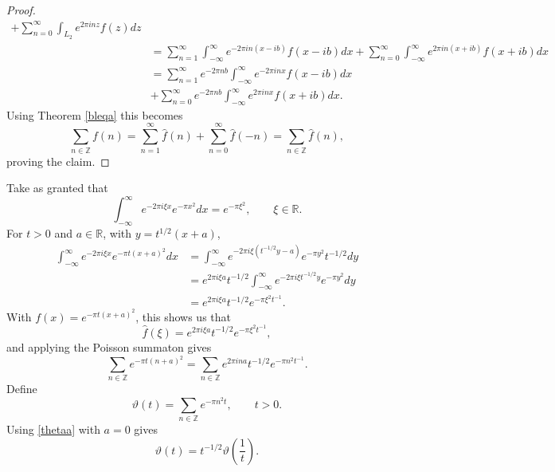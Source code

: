 \documentclass{article}
\theoremstyle{definition}
\begin{document}
\begin{proof}
\begin{align*}
+\sum_{n=0}^\infty \int_{L_2} e^{2\pi inz} f(z) dz\\
&=\sum_{n=1}^\infty \int_{-\infty}^\infty e^{-2\pi in(x-ib)}f(x-ib) dx
+\sum_{n=0}^\infty \int_{-\infty}^\infty e^{2\pi in(x+ib)}f(x+ib) dx\\
&=\sum_{n=1}^\infty e^{-2\pi nb} \int_{-\infty}^\infty e^{-2\pi inx} f(x-ib) dx\\
&+\sum_{n=0}^\infty e^{-2\pi nb} \int_{-\infty}^\infty e^{2\pi inx} f(x+ib) dx.
\end{align*}
Using Theorem \ref{bleqa} this becomes
\[
\sum_{n \in \mathbb{Z}} f(n) = \sum_{n=1}^\infty \widehat{f}(n) + \sum_{n=0}^\infty \widehat{f}(-n)
=\sum_{n \in \mathbb{Z}} \widehat{f}(n),
\]
proving the claim.
\end{proof}

Take as granted that
\[
\int_{-\infty}^\infty e^{-2\pi i\xi x} e^{-\pi x^2} dx = e^{-\pi \xi^2}, 
\qquad \xi \in \mathbb{R}.
\]
For $t>0$ and $a \in \mathbb{R}$, with $y=t^{1/2}(x+a)$,
\begin{align*}
\int_{-\infty}^\infty e^{-2\pi i\xi x} e^{-\pi t(x+a)^2} dx&=\int_{-\infty}^\infty 
e^{-2\pi i\xi(t^{-1/2}y-a)} e^{-\pi y^2} t^{-1/2} dy\\
&=e^{2\pi i\xi a} t^{-1/2} \int_{-\infty}^\infty e^{-2\pi i\xi t^{-1/2} y} e^{-\pi y^2} dy\\
&=e^{2\pi i\xi a} t^{-1/2}  e^{-\pi\xi^2 t^{-1}}.
\end{align*}
With $f(x)=e^{-\pi t(x+a)^2}$, this shows us that 
\[
\widehat{f}(\xi) = e^{2\pi i\xi a} t^{-1/2}  e^{-\pi\xi^2 t^{-1}},
\]
and applying the Poisson summaton gives
\begin{equation}
\sum_{n \in \mathbb{Z}} e^{-\pi t(n+a)^2} = \sum_{n \in \mathbb{Z}}  e^{2\pi in a} t^{-1/2}  e^{-\pi n^2 t^{-1}}.
\label{thetaa}
\end{equation}
Define
\[
\vartheta(t) = \sum_{n \in \mathbb{Z}} e^{-\pi n^2 t}, \qquad t>0.
\]
Using \eqref{thetaa} with $a=0$ gives
\[
\vartheta(t)=
t^{-1/2} \vartheta\left(\frac{1}{t}\right).
\]
\end{document}
